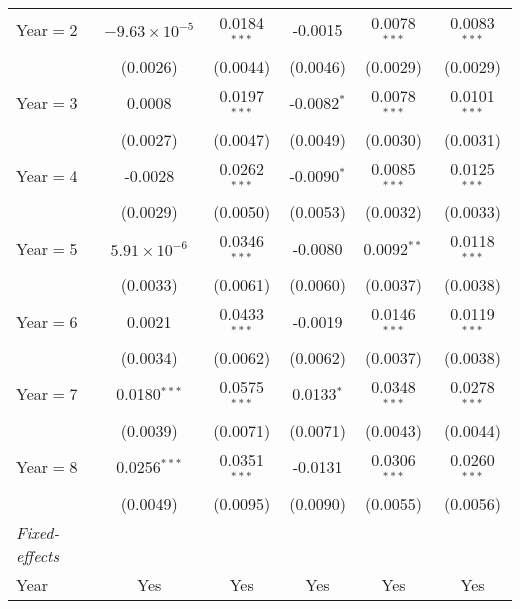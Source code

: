 \begin{table}[htbp]
\begin{tabular}{lccccc}
      Year$=$2             & $-9.63\times 10^{-5}$ & 0.0184$^{***}$  & -0.0015         & 0.0078$^{***}$         & 0.0083$^{***}$\\
                           & (0.0026)               & (0.0044)        & (0.0046)        & (0.0029)               & (0.0029)\\
      Year$=$3             & 0.0008                 & 0.0197$^{***}$  & -0.0082$^{*}$   & 0.0078$^{***}$         & 0.0101$^{***}$\\
                           & (0.0027)               & (0.0047)        & (0.0049)        & (0.0030)               & (0.0031)\\
      Year$=$4             & -0.0028                & 0.0262$^{***}$  & -0.0090$^{*}$   & 0.0085$^{***}$         & 0.0125$^{***}$\\
                           & (0.0029)               & (0.0050)        & (0.0053)        & (0.0032)               & (0.0033)\\
      Year$=$5             & $5.91\times 10^{-6}$  & 0.0346$^{***}$  & -0.0080         & 0.0092$^{**}$          & 0.0118$^{***}$\\
                           & (0.0033)               & (0.0061)        & (0.0060)        & (0.0037)               & (0.0038)\\
      Year$=$6             & 0.0021                 & 0.0433$^{***}$  & -0.0019         & 0.0146$^{***}$         & 0.0119$^{***}$\\
                           & (0.0034)               & (0.0062)        & (0.0062)        & (0.0037)               & (0.0038)\\
      Year$=$7             & 0.0180$^{***}$         & 0.0575$^{***}$  & 0.0133$^{*}$    & 0.0348$^{***}$         & 0.0278$^{***}$\\
                           & (0.0039)               & (0.0071)        & (0.0071)        & (0.0043)               & (0.0044)\\
      Year$=$8             & 0.0256$^{***}$         & 0.0351$^{***}$  & -0.0131         & 0.0306$^{***}$         & 0.0260$^{***}$\\
                           & (0.0049)               & (0.0095)        & (0.0090)        & (0.0055)               & (0.0056)\\
      \midrule \emph{Fixed-effects} &   &   &   &   &  \\
      Year                 & Yes                    & Yes             & Yes             & Yes                    & Yes\\

\end{tabular}
\end{table}
